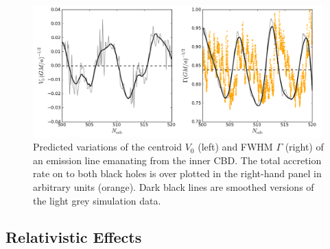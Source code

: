 \begin{figure}
\begin{center}
\includegraphics[scale=0.30]{figures/ch3/fig4}  \vspace{-25 pt}
\end{center}
\caption{Predicted variations of the centroid $V_0$ (left) and FWHM
  $\Gamma$ (right) of an emission line emanating from the inner 
  CBD. The total accretion rate on to both black
  holes is over plotted in the right-hand panel in arbitrary units
  (orange). Dark black lines are smoothed versions of the light grey
  simulation data.}
\label{Fig:BLs}
\end{figure}




\subsection{Relativistic Effects}
\label{SS:Rel}


